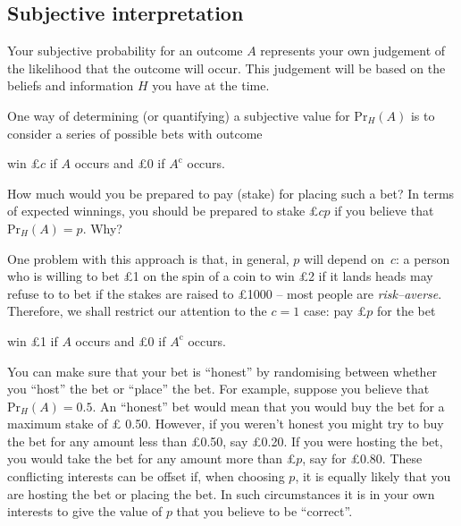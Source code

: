 \subsection*{Subjective interpretation}
Your subjective probability for an outcome $A$ represents your own
judgement of the likelihood that the outcome will occur. This
judgement will be based on the beliefs and information $H$ you have
at the time.

One way of determining (or quantifying) a subjective value for
$\text{Pr}_H(A)$ is to consider a series of possible bets with outcome

win \pounds $c$ if $A$ occurs and \pounds 0 if $A^{\text{c}}$ occurs.

How much would you be prepared to pay (stake) for placing such a bet?
In terms of expected winnings, you should be prepared to stake \pounds $cp$
if you believe that $\text{Pr}_H(A)=p$.  Why? 


 





One problem with this approach is that, in general, $p$ will depend
on~$c$: a person who is willing to bet
\pounds 1 on the spin of a coin to win \pounds 2 if it lands heads may
refuse to to bet if the stakes are raised to \pounds 1000 -- most
people are \textit{risk--averse}. Therefore, we shall restrict our attention to
the $c=1$ case: pay \pounds $p$ for the bet

win \pounds 1 if $A$ occurs and \pounds 0 if $A^{\text{c}}$ occurs.


You can make sure that your bet is ``honest'' by randomising between
whether you ``host'' the bet or ``place'' the bet. For example,
suppose you believe that $\text{Pr}_H(A)=0.5$. An ``honest'' bet would mean
that you would buy the bet for a maximum stake of \pounds
0.50. However, if you weren't honest you might try to buy the bet for
any amount less than \pounds 0.50, say \pounds 0.20. If you were
hosting the bet, you would take the bet for any amount more than
\pounds $p$, say for \pounds 0.80. These conflicting interests can be
offset if, when choosing $p$, it is equally likely that you are
hosting the bet or placing the bet. In such circumstances it is in
your own interests to give the value of $p$ that you believe to be
``correct''.

